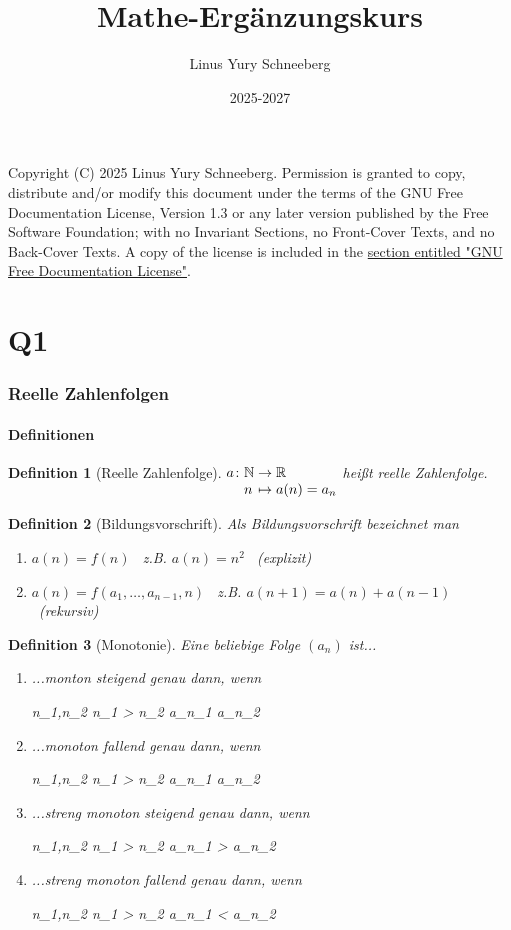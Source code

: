 \documentclass{article}
\title{Mathe-Ergänzungskurs}
\author{Linus Yury Schneeberg}
\date{2025-2027}
\newcommand\func[5]{%
	\begingroup
	\setlength\arraycolsep{0pt}
	#1\colon\begin{array}[t]{l >{{}}c<{{}} l}
		#2 & \to & #3 \\ #4 & \mapsto & #5 
	\end{array}%
	\endgroup}
\newtheorem{defn}{Definition}[section]
\newenvironment{aleq*}{\begin{equation*}\begin{aligned}}{\end{aligned}\end{equation*}}
\newcommand{\LICENSE}{
	Copyright (C)  2025 Linus Yury Schneeberg.
	Permission is granted to copy, distribute and/or modify this document
	under the terms of the GNU Free Documentation License, Version 1.3
	or any later version published by the Free Software Foundation;
	with no Invariant Sections, no Front-Cover Texts, and no Back-Cover Texts.
	A copy of the license is included in the \hyperref[sec:fdl]{section entitled "GNU
	Free Documentation License"}.
}
\begin{document}
	\maketitle
	\tableofcontents
	\newpage
	\LICENSE
	\newpage
	
	\part{Q1}
	\section{Reelle Zahlenfolgen}
	\subsection{Definitionen}
	\begin{defn}[Reelle Zahlenfolge]
		\quad\newline
	\(\func{a}{\mathbb{N}}{\mathbb{R}}{n}{a(n)=a_n}\) heißt reelle Zahlenfolge.
	\end{defn}
	\begin{defn}[Bildungsvorschrift]
		Als Bildungsvorschrift bezeichnet man 
		\begin{enumerate}[label=(\alph*)]
			\item \(a(n) = f(n)\) \ z.B. \(a(n) = n^2\) \ (explizit)
			\item \(a(n) = f(a_1, \dots, a_{n-1}, n)\) \ z.B. \(a(n+1) = a(n) + a(n-1)\) \ (rekursiv)
		\end{enumerate}
	\end{defn}
	
	\begin{defn}[Monotonie]
		\label{defMonotonie}
	Eine beliebige Folge \((a_n)\) ist...
	\begin{enumerate}
		\item ...monton steigend genau dann, wenn
		\begin{aleq*}
			\forall n_1,n_2 \in {} \colon n_1 > n_2 \implies a_{n_1} \geq a_{n_2} 
		\end{aleq*}
		
		\item ...monoton fallend genau dann, wenn
		\begin{aleq*}
			\forall n_1,n_2 \in {} \colon n_1 > n_2 \implies a_{n_1} \leq a_{n_2} \text{.}
		\end{aleq*}
		
		\item ...streng monoton steigend genau dann, wenn
		\begin{aleq*}
			\forall n_1,n_2 \in {} \colon n_1 > n_2 \implies a_{n_1} > a_{n_2} 
		\end{aleq*}
		
		\item ...streng monoton fallend genau dann, wenn
		\begin{aleq*}
			\forall n_1,n_2 \in {} \colon n_1 > n_2 \implies a_{n_1} < a_{n_2} \text{.}
		\end{aleq*}
	\end{enumerate}
	\end{defn}
	
\end{document}
